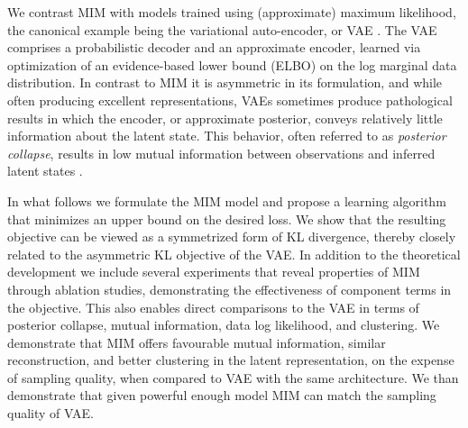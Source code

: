 We contrast MIM with models trained using (approximate) maximum likelihood, 
the canonical example being the variational auto-encoder, or VAE 
\citep{Kingma2013,Rezende2014}. The VAE comprises a probabilistic decoder 
and an approximate encoder, learned via optimization of an evidence-based 
lower bound (ELBO) on the log marginal data distribution.  In contrast to
MIM it is asymmetric in its formulation, and while often producing excellent 
representations, VAEs sometimes produce pathological results in which the 
encoder, or approximate posterior, conveys relatively little information about
the latent state. This behavior, often referred to as {\em posterior collapse}, 
results in low mutual information between observations and inferred latent 
states \citep{DBLP:journals/corr/BowmanVVDJB15,ChenKSDDSSA16,
DBLP:journals/corr/abs-1901-03416,DBLP:journals/corr/OordKK16,
DBLP:journals/corr/abs-1711-00937}.

In what follows we formulate the MIM model and propose a learning
algorithm that minimizes an upper bound on the desired loss.
We show that the resulting objective can be viewed as a symmetrized
form of KL divergence, thereby closely related to the asymmetric KL
objective of the VAE.
In addition to the theoretical development we include several
experiments that reveal properties of MIM through ablation studies,
demonstrating the effectiveness of component terms in the objective.
This also enables direct comparisons to the VAE in terms of posterior
collapse, mutual information, data log likelihood, and clustering.
We demonstrate that MIM offers favourable mutual information, similar reconstruction, and better clustering in the latent representation, on the expense of sampling quality, when compared to VAE
with the same architecture. We than demonstrate that given powerful enough model MIM can match the sampling quality of VAE.




